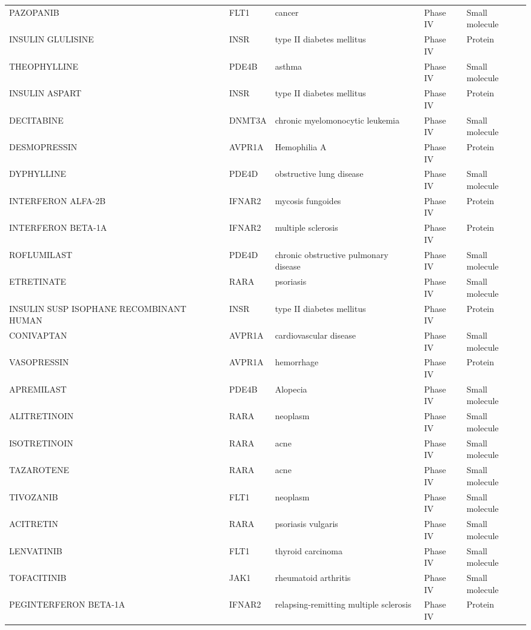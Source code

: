 \documentclass[fleqn,10pt]{SelfArx} %
\begin{document}
\begin{table}[ht]
\begin{tabularx}{\textwidth}{lXlll}
		PAZOPANIB & FLT1 & cancer & Phase IV & Small molecule \\ 
		INSULIN GLULISINE & INSR & type II diabetes mellitus & Phase IV & Protein \\ 
		THEOPHYLLINE & PDE4B & asthma & Phase IV & Small molecule \\ 
		INSULIN ASPART & INSR & type II diabetes mellitus & Phase IV & Protein \\ 
		DECITABINE & DNMT3A & chronic myelomonocytic leukemia & Phase IV & Small molecule \\ 
		DESMOPRESSIN & AVPR1A & Hemophilia A & Phase IV & Protein \\ 
		DYPHYLLINE & PDE4D & obstructive lung disease & Phase IV & Small molecule \\ 
		INTERFERON ALFA-2B & IFNAR2 & mycosis fungoides & Phase IV & Protein \\ 
		INTERFERON BETA-1A & IFNAR2 & multiple sclerosis & Phase IV & Protein \\ 
		ROFLUMILAST & PDE4D & chronic obstructive pulmonary disease & Phase IV & Small molecule \\ 
		ETRETINATE & RARA & psoriasis & Phase IV & Small molecule \\ 
		INSULIN SUSP ISOPHANE RECOMBINANT HUMAN & INSR & type II diabetes mellitus & Phase IV & Protein \\ 
		CONIVAPTAN & AVPR1A & cardiovascular disease & Phase IV & Small molecule \\ 
		VASOPRESSIN & AVPR1A & hemorrhage & Phase IV & Protein \\ 
		APREMILAST & PDE4B & Alopecia & Phase IV & Small molecule \\ 
		ALITRETINOIN & RARA & neoplasm & Phase IV & Small molecule \\ 
		ISOTRETINOIN & RARA & acne & Phase IV & Small molecule \\ 
		TAZAROTENE & RARA & acne & Phase IV & Small molecule \\ 
		TIVOZANIB & FLT1 & neoplasm & Phase IV & Small molecule \\ 
		ACITRETIN & RARA & psoriasis vulgaris & Phase IV & Small molecule \\ 
		LENVATINIB & FLT1 & thyroid carcinoma & Phase IV & Small molecule \\ 
		TOFACITINIB & JAK1 & rheumatoid arthritis & Phase IV & Small molecule \\ 
		PEGINTERFERON BETA-1A & IFNAR2 & relapsing-remitting multiple sclerosis & Phase IV & Protein \\ 

\end{tabularx}
\end{table}
\end{document}
